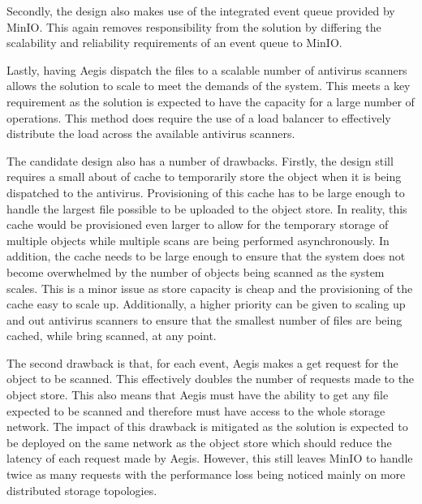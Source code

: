 \documentclass[12pt, conference, final, a4paper, onecolumn, compsoc]{IEEEtran}
\begin{document}
Secondly, the design also makes use of the integrated event queue provided by
MinIO. This again removes responsibility from the solution by differing the
scalability and reliability requirements of an event queue to MinIO.


Lastly, having Aegis dispatch the files to a scalable number of antivirus
scanners allows the solution to scale to meet the demands of the system. This
meets a key requirement as the solution is expected to have the capacity for a
large number of operations. This method does require the use of a load balancer
to effectively distribute the load across the available antivirus scanners.

The candidate design also has a number of drawbacks. Firstly, the design still
requires a small about of cache to temporarily store the object when it is being
dispatched to the antivirus. Provisioning of this cache has to be large enough
to handle the largest file possible to be uploaded to the object store. In
reality, this cache would be provisioned even larger to allow for the temporary
storage of multiple objects while multiple scans are being performed
asynchronously. In addition, the cache needs to be large enough to ensure that
the system does not become overwhelmed by the number of objects being scanned as
the system scales. This is a minor issue as store capacity is cheap and the
provisioning of the cache easy to scale up. Additionally, a higher priority can
be given to scaling up and out antivirus scanners to ensure that the smallest
number of files are being cached, while bring scanned, at any point.


The second drawback is that, for each event, Aegis makes a get request for the
object to be scanned. This effectively doubles the number of requests made to
the object store. This also means that Aegis must have the ability to get any
file expected to be scanned and therefore must have access to the whole storage
network. The impact of this drawback is mitigated as the solution is expected to
be deployed on the same network as the object store which should reduce the
latency of each request made by Aegis. However, this still leaves MinIO to
handle twice as many requests with the performance loss being noticed mainly on
more distributed storage topologies.
\end{document}
